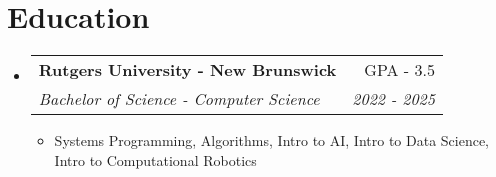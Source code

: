 \documentclass[letterpaper,10pt]{article}
\makeatletter
\newcommand{\resumeItem}[1]{
  \item\small{
    {#1 \vspace{-2pt}}
  }
}
\newcommand{\resumeSubheading}[4]{
  \vspace{-2pt}\item
    \begin{tabular*}{0.97\textwidth}[t]{l@{\extracolsep{\fill}}r}
      \textbf{#1} & #2 \\
      \textit{\small#3} & \textit{\small #4} \\
    \end{tabular*}\vspace{-7pt}
}
\newcommand{\resumeSubHeadingListStart}{\begin{itemize}[leftmargin=0.15in, label={}]}
\newcommand{\resumeSubHeadingListEnd}{\end{itemize}}
\newcommand{\resumeItemListStart}{\begin{itemize}}
\newcommand{\resumeItemListEnd}{\end{itemize}\vspace{-5pt}}
\makeatother
\begin{document}
\section{Education}
  \resumeSubHeadingListStart
    \resumeSubheading
      {Rutgers University - New Brunswick}{GPA - 3.5}
      {Bachelor of Science - Computer Science}{2022 - 2025}
      \resumeItemListStart
        \resumeItem{Systems Programming, Algorithms, Intro to AI, Intro to Data Science, Intro to Computational Robotics}
    \resumeItemListEnd
  \resumeSubHeadingListEnd
\end{document}
